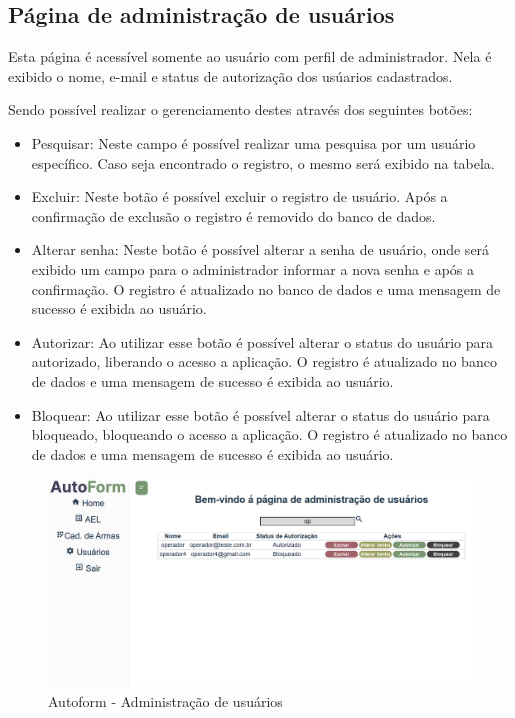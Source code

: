 \subsection{Página de administração de usuários}
Esta página é acessível somente ao usuário com perfil de administrador.
Nela é exibido o nome, e-mail e status de autorização dos usúarios cadastrados.

Sendo possível realizar o gerenciamento destes através dos seguintes botões:
\begin{itemize}
    \item Pesquisar: Neste campo é possível realizar uma pesquisa por um usuário específico. Caso seja encontrado o registro, o mesmo será exibido na tabela.
    \item Excluir: Neste botão é possível excluir o registro de usuário. Após a confirmação de exclusão o registro é removido do banco de dados.
    \item Alterar senha: Neste botão é possível alterar a senha de usuário, onde será exibido um campo para o administrador informar a nova senha e após a confirmação. O registro é atualizado no banco de dados e uma mensagem de sucesso é exibida ao usuário.
    \item Autorizar: Ao utilizar esse botão é possível alterar o status do usuário para autorizado, liberando o acesso a aplicação. O registro é atualizado no banco de dados e uma mensagem de sucesso é exibida ao usuário.
    \item Bloquear: Ao utilizar esse botão é possível alterar o status do usuário para bloqueado, bloqueando o acesso a aplicação. O registro é atualizado no banco de dados e uma mensagem de sucesso é exibida ao usuário.
\end{itemize}

\begin{figure}[H]
    \caption{\label{fig:tela-configuracoes}Autoform - Administração de usuários}
    \begin{center}
        \includegraphics[scale=0.5]{imagens/autoform-configuracoes.png}
    \end{center}
\end{figure}



